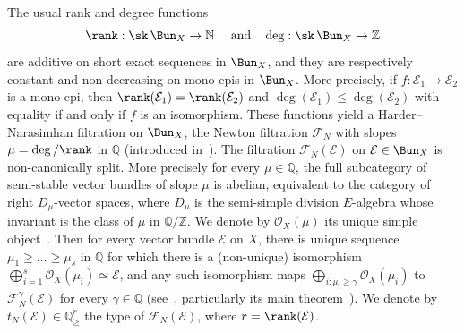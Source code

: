 The usual rank and degree functions
\[
\rank:\sk\,\Bun_{X}\rightarrow\mathbb{N}\quad\text{ and}\quad\deg:\sk\,\Bun_{X}\rightarrow\mathbb{Z}
\]
are additive on short exact sequences in $\Bun_{X}$, and they are respectively constant and non-decreasing on mono-epis in $\Bun_{X}$. More precisely, if $f:\mathcal{E}_{1}\rightarrow\mathcal{E}_{2}$ is a mono-epi, then $\rank(\mathcal{E}_{1})=\rank(\mathcal{E}_{2})$ and $\deg(\mathcal{E}_{1})\leq\deg(\mathcal{E}_{2})$ with equality if and only if $f$ is an isomorphism. These functions yield a Harder--Narasimhan filtration on $\Bun_{X}$, the Newton filtration $\mathcal{F}_{N}$ with slopes $\mu=\deg/\rank$ in $\mathbb{Q}$ (introduced in~\cite[5.5]{FaFo15}). The filtration $\mathcal{F}_{N}(\mathcal{E})$ on $\mathcal{E}\in\Bun_{X}$ is non-canonically split. More precisely for every $\mu\in\mathbb{Q}$, the full subcategory of semi-stable vector bundles of slope $\mu$ is abelian, equivalent to the category of right $D_{\mu}$-vector spaces, where $D_{\mu}$ is the semi-simple division $E$-algebra whose invariant is the class of $\mu$ in $\mathbb{Q}/\mathbb{Z}$. We denote by $\mathcal{O}_{X}(\mu)$ its unique simple object~\cite[5.6.22]{FaFo15}. Then for every vector bundle $\mathcal{E}$ on $X$, there is unique sequence $\mu_{1}\geq\dots\geq\mu_{s}$ in $\mathbb{Q}$ for which there is a (non-unique) isomorphism $\bigoplus_{i=1}^{s}\mathcal{O}_{X}(\mu_{i})\simeq\mathcal{E}$, and any such isomorphism maps $\bigoplus_{i:\mu_{i}\geq\gamma}\mathcal{O}_{X}(\mu_{i})$ to $\mathcal{F}_{N}^{\gamma}(\mathcal{E})$ for every $\gamma\in\mathbb{Q}$ (see~\cite[Chapter~$8$]{FaFo15}, particularly its main theorem~\cite[8.2.10]{FaFo15}). We denote by $t_{N}(\mathcal{E})\in\mathbb{Q}_{\geq}^{r}$ the type of $\mathcal{F}_{N}(\mathcal{E})$, where $r=\rank(\mathcal{E})$.

